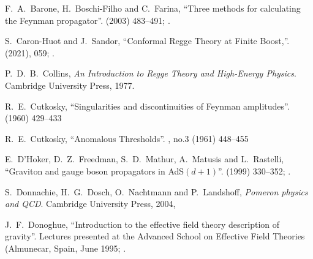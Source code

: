 \begin{thebibliography}{99}

F.~A.~Barone, H.~Boschi-Filho and C.~Farina,
``Three methods for calculating the Feynman propagator''.
  (2003) 483--491; .\newline
{\tt{}}

S.~Caron-Huot and J.~Sandor,
``Conformal Regge Theory at Finite Boost,''.
  (2021), 059; .\newline
{\tt{}}

P.~D.~B.~Collins,
\textit{An Introduction to Regge Theory and High-Energy Physics}.
Cambridge University Press, 1977.\newline
{\tt{}}

R.~E.~Cutkosky,
``Singularities and discontinuities of Feynman amplitudes''.
  (1960) 429--433\newline
{\tt{}}

R.~E.~Cutkosky,
``Anomalous Thresholds''.
 , no.3 (1961) 448--455\newline
{\tt{}}

E.~D'Hoker, D.~Z.~Freedman, S.~D.~Mathur, A.~Matusis and L.~Rastelli,
``Graviton and gauge boson propagators in AdS$(d+1)$''.
  (1999) 330--352;
.\newline
{\tt{}}

S.~Donnachie, H.~G.~Dosch, O.~Nachtmann and P.~Landshoff,
\emph{Pomeron physics and QCD}.
Cambridge University Press, 2004,

J.~F.~Donoghue,
``Introduction to the effective field theory description of gravity''.
Lectures presented at the Advanced School on Effective Field Theories
(Almunecar, Spain, June 1995; .


\end{thebibliography}
